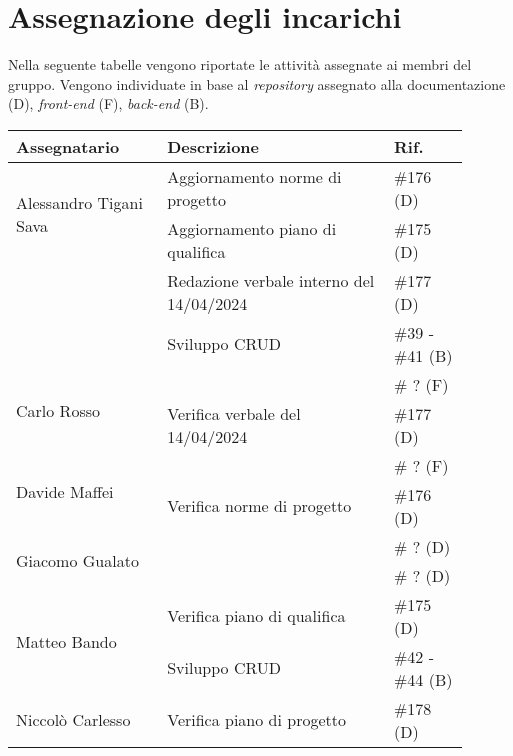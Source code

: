 \section{Assegnazione degli incarichi}
Nella seguente tabelle vengono riportate le attività assegnate ai membri del gruppo.
Vengono individuate in base al \textit{repository} assegnato alla documentazione (D), \textit{front-end} (F), \textit{back-end} (B).

\begin{center}
	{
		\renewcommand{\arraystretch}{1.5}
		\begin{tabular}{p{0.30\linewidth}|p{0.45\linewidth}|p{0.15\linewidth}}
			\textbf{Assegnatario}          			& \textbf{Descrizione}				& \textbf{Rif.} \\
			\hline
			\multirow{2}{*}{Alessandro Tigani Sava}	& Aggiornamento norme di progetto	& \#176 (D)	\\
			\cline{2-3}
													& Aggiornamento piano di qualifica	& \#175	(D)	\\
			\cline{2-3}
													& Redazione verbale interno del 14/04/2024	& \#177	(D)	\\
			\cline{2-3}
													& Sviluppo CRUD		& \#39 - \#41 (B)	\\
			\hline
			\multirow{2}{*}{Carlo Rosso}   			& 		& \# ? (F)	\\
			\cline{2-3}
			                               			& Verifica verbale del 14/04/2024	& \#177	(D)	\\
			\hline
			\multirow{2}{*}{Davide Maffei} 			& 	& \# ? (F)	\\
			\cline{2-3}
			                               			& Verifica norme di progetto		& \#176 (D)	\\
			\hline
			\multirow{2}{*}{Giacomo Gualato}		& 	& \# ? (D)	\\
			\cline{2-3}
			                               			& 	& \# ? (D)	\\
			\hline
			\multirow{2}{*}{Matteo Bando}  			& Verifica piano di qualifica		& \#175	(D)	\\
			\cline{2-3}
			                               			& Sviluppo CRUD	& \#42 - \#44 (B)	\\
			\hline
			Niccolò Carlesso               			& Verifica piano di progetto		& \#178 (D)	\\
			\hline
		\end{tabular}
	}
\end{center}
